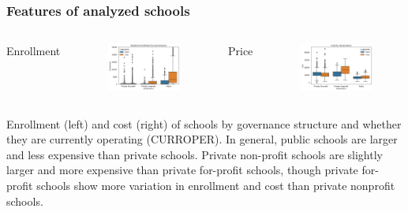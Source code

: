 \documentclass{beamer}
\begin{document}
\begin{frame} 
\frametitle{Features of analyzed schools}
\begin{columns}

\column{2in}
\begin{center}
Enrollment
\end{center}
\begin{figure}
\includegraphics[width=2in]{currentUGDSControlBox.png}
\end{figure}

\column{2in}
\begin{center}
Price
\end{center}
\begin{figure}
\includegraphics[width=2in]{currentPriceControlBox.png}
\end{figure}

\end{columns}
\begin{center}
Enrollment (left) and cost (right) of schools by governance structure and whether they are currently operating (CURROPER).  In general, public schools are larger and less expensive than private schools. Private non-profit schools are slightly larger and more expensive than private for-profit schools, though private for-profit schools show more variation in enrollment and cost than private nonprofit schools.
\end{center}

\end{frame}










\end{document}
